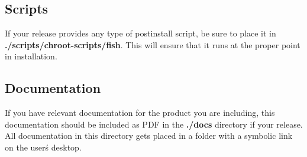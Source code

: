 \documentclass[letterpaper,10pt,titlepage]{article}
\begin{document}
\subsection{Scripts}
If your release provides any type of postinstall script, be sure to place it in \textbf{./scripts/chroot-scripts/fish}.  This will ensure that it runs at the proper point in installation.

\subsection{Documentation}
If you have relevant documentation for the product you are including, this documentation should be included as PDF in the \textbf{./docs} directory if your release.  All documentation in this directory gets placed in a folder with a symbolic link on the user\'s desktop.
\end{document}
